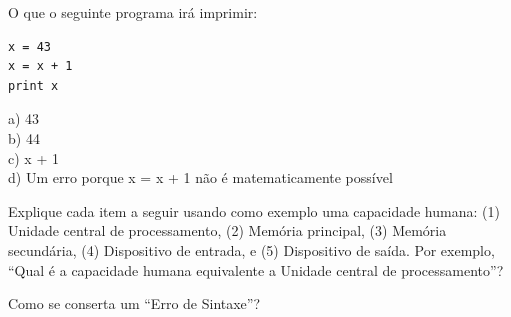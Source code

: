 \begin{ex}
O que o seguinte programa irá imprimir:

\beforeverb
\begin{verbatim}
x = 43
x = x + 1
print x
\end{verbatim}
\afterverb
%
a) 43\\
b) 44\\
c) x + 1\\
d) Um erro porque x = x + 1 não é matematicamente possível
\end{ex}
%
%

\begin{ex}
Explique cada item a seguir usando como exemplo uma capacidade humana:
(1) Unidade central de processamento, (2) Memória principal, (3) Memória secundária, 
(4) Dispositivo de entrada, e
(5) Dispositivo de saída.
Por exemplo, ``Qual é a capacidade humana equivalente a Unidade central de processamento''? 
\end{ex}
%

\begin{ex}
Como se conserta um ``Erro de Sintaxe''?
\end{ex}
%
%